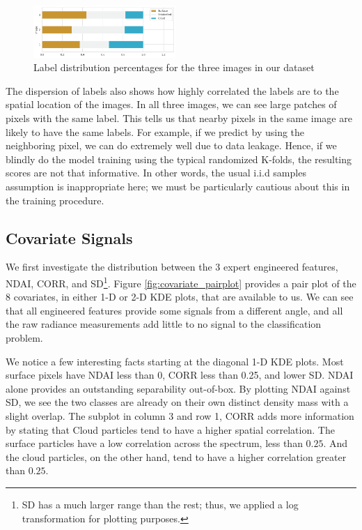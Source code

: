 \documentclass[11pt, letterpaper, journal]{IEEEtran}
\begin{document}
\begin{figure}[!h]
\centering
\includegraphics[width=0.48\textwidth]{2.a.png}
\caption{Label distribution percentages for the three images in our dataset}
\label{fig:label_dist}
\end{figure}

The dispersion of labels also shows how highly correlated the labels are to the spatial location of the images. In all three images, we can see large patches of pixels with the same label. This tells us that nearby pixels in the same image are likely to have the same labels. For example, if we predict by using the neighboring pixel, we can do extremely well due to data leakage. Hence, if we blindly do the model training using the typical randomized K-folds, the resulting scores are not that informative. In other words, the usual i.i.d samples assumption is inappropriate here; we must be particularly cautious about this in the training procedure.


\subsection{Covariate Signals}
We first investigate the distribution between the 3 expert engineered features, NDAI, CORR, and SD\footnote{SD has a much larger range than the rest; thus, we applied a log transformation for plotting purposes.}. Figure \ref{fig:covariate_pairplot} provides a pair plot of the 8 covariates, in either 1-D or 2-D KDE plots, that are available to us. We can see that all engineered features provide some signals from a different angle, and all the raw radiance measurements add little to no signal to the classification problem.

We notice a few interesting facts starting at the diagonal 1-D KDE plots. Most surface pixels have NDAI less than 0, CORR less than 0.25, and lower SD. NDAI alone provides an outstanding separability out-of-box. By plotting NDAI against SD, we see the two classes are already on their own distinct density mass with a slight overlap. The subplot in column 3 and row 1, CORR adds more information by stating that Cloud particles tend to have a higher spatial correlation. The surface particles have a low correlation across the spectrum, less than $0.25$. And the cloud particles, on the other hand, tend to have a higher correlation greater than $0.25$.
\end{document}
